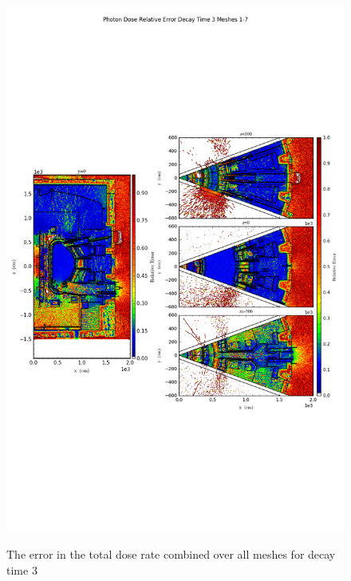 \documentclass[12pt]{article}
\begin{document}
\begin{figure}[ht!]
\centering
\includegraphics[trim={0cm 9cm 0cm 10cm},clip,scale=0.75]{../plots/final_model_nob4c/Photon_Dose_Relative_Error_Decay_Time_3_Meshes_1-7.png}
\label{fig:photons_dc3_no4bc_total_error}
\caption{The error in the total dose rate combined over all meshes for decay time 3}
\end{figure}
\end{document}
